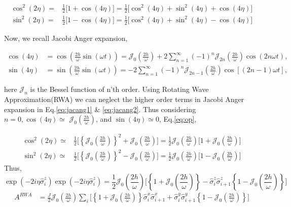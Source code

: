 \documentclass[aps,prb,reprint,showpacs,floatfix,superscriptaddress, onecolumn, nofootinbib, 9pt]{revtex4-2}
\begin{document}
\begin{enumerate}
{\begin{align}
	\cos^2(2\eta) =& \frac12\big[1+\cos(4\eta)\big]=\frac12\big[\cos^2(4\eta)+ \sin^2(4\eta)+\cos(4\eta)\big]\nonumber\\
	\sin^2(2\eta) =& \frac12\big[1-\cos(4\eta)\big]=\frac12\big[\cos^2(4\eta)+ \sin^2(4\eta)-\cos(4\eta)\big]
	\label{eq:cossin}
\end{align}

Now, we recall Jacobi Anger expansion,

\begin{align}
	\cos (4 \eta)&=\cos \left(\frac{2 h}{\omega} \sin (\omega t)\right)=\mathcal{J}_{0}\left(\frac{2 h}{\omega}\right)+2 \sum_{n=1}^{\infty}(-1)^{n} \mathcal{J}_{2 n}\left(\frac{2 h}{\omega}\right) \cos (2 n \omega t),\label{eq:jacang1} \\
	\sin (4 \eta)&=\sin \left(\frac{2 h}{\omega} \sin (\omega t)\right)=-2 \sum_{n=1}^{\infty}(-1)^{n} \mathcal{J}_{2 n-1}\left(\frac{2 h}{\omega}\right) \cos [(2 n-1) \omega t],
	\label{eq:jacang2}
\end{align}

here $\mathcal{J}_{n}$ is the Bessel function of n'th order. Using Rotating Wave Approximation(RWA) we can neglect the higher order terms in Jacobi Anger expansion in Eq.\eqref{eq:jacang1} \& \eqref{eq:jacang2}. Thus considering $n=0, \cos (4 \eta) \simeq$ $\mathcal{J}_{0}\left(\frac{2 h}{\omega}\right)$, and $\sin (4 \eta) \simeq 0$, Eq.\eqref{eq:op},

\begin{align}
	\cos^2(2\eta) \simeq& \frac12\Bigg[\left\{\mathcal{J}_0\left(\frac{2h}{\omega}\right)\right\}^2 + \mathcal{J}_0\left(\frac{2h}{\omega}\right)\Bigg]=\frac12 \mathcal{J}_0\left(\frac{2h}{\omega}\right)\Bigg[1+ \mathcal{J}_0\left(\frac{2h}{\omega}\right)\Bigg]\nonumber\\
	\sin^2(2\eta) \simeq& \frac12\Bigg[\left\{\mathcal{J}_0\left(\frac{2h}{\omega}\right)\right\}^2 - \mathcal{J}_0\left(\frac{2h}{\omega}\right)\Bigg]=\frac12 \mathcal{J}_0\left(\frac{2h}{\omega}\right)\Bigg[1- \mathcal{J}_0\left(\frac{2h}{\omega}\right)\Bigg]
	\label{eq:cossin}
\end{align}
Thus,
\begin{equation}
	\exp\left(-2i\eta\hat{\sigma}^z_i\right)\exp\left(-2i\eta\hat{\sigma}^z_i\right) = \frac12 \mathcal{J}_0\left(\frac{2h}{\omega}\right)\Bigg[\left\{1+ \mathcal{J}_0\left(\frac{2h}{\omega}\right)\right\} - \hat{\sigma}^z_i\hat{\sigma}^z_{i+1}\left\{1- \mathcal{J}_0\left(\frac{2h}{\omega}\right)\right\} \Bigg]
\end{equation}
\begin{align}
	A^{R W A}&=\frac{J}{2} \mathcal{J}_0\left(\frac{2h}{\omega}\right)\sum_{i}\Bigg[\left\{1+ \mathcal{J}_0\left(\frac{2h}{\omega}\right)\right\} \hat{\sigma}_{i}^{x} \hat{\sigma}_{i+1}^{x} + \hat{\sigma}^y_i\hat{\sigma}^y_{i+1}\left\{1- \mathcal{J}_0\left(\frac{2h}{\omega}\right)\right\} \Bigg]
	\label{eq:hrwa1}
\end{align}

}
\end{enumerate}
\end{document}
